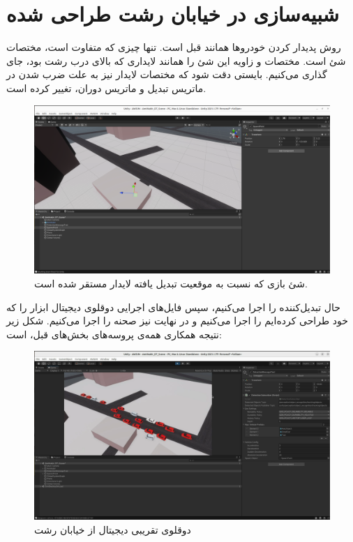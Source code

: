 \section{شبیه‌سازی در خیابان رشت طراحی شده}
 روش پدیدار کردن خودروها همانند قبل است. تنها چیزی که متفاوت است،‌ مختصات شئ  است. مختصات و زاویه این شئ را همانند لایداری که بالای درب رشت بود، جای گذاری می‌کنیم. بایستی دقت شود که مختصات لایدار نیز به علت ضرب شدن در ماتریس تبدیل و ماتریس دوران، تغییر کرده است.
 \begin{figure}
     \centering
     \includegraphics[width=0.75\linewidth]{figures/Amirkabir_DT_SpawnPoint.png}
     \caption{شئ بازی  که نسبت به موقعیت تبدیل یافته لایدار مستقر شده است.}
     \label{fig:Amirkabir_DT_SpawnPoint}
 \end{figure}
 حال تبدیل‌کننده را اجرا می‌کنیم، سپس فایل‌های اجرایی دوقلوی دیجیتال ابزار  را که خود طراحی کرده‌ایم را اجرا می‌کنیم و در نهایت نیز صحنه  را اجرا می‌کنیم. شکل زیر نتیجه همکاری همه‌ی پروسه‌های بخش‌های قبل، است:

 \begin{figure}[h!]
     \centering
     \includegraphics[width=1\linewidth]{figures/Amirkabir_Traffic_Simulation.png}
     \caption{دوقلوی تقریبی دیجیتال از خیابان رشت}
     \label{fig:Amirkabir_Traffic_Simulation}
 \end{figure}

